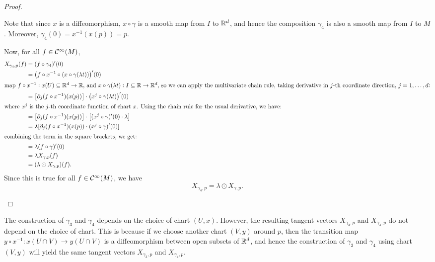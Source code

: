 \begin{proof}
\begin{enumerate}
		      Note that since \(x\) is a diffeomorphism, \(x \circ \gamma\) is a smooth map from \(I\) to \(\mathbb R^d\), and hence the composition \(\gamma_4\) is also a smooth map from \(I\) to \(M\). Moreover, \(\gamma_4(0) = x^{-1}(x(p)) = p\).

		      Now, for all \(f \in \mathcal C^\infty(M)\),
		      \begin{align*}
			      X_{\gamma_4, p}(f) & = (f \circ \gamma_4)'(0)                                                                   \\
			                         & = \qty(f \circ x^{-1} \circ (x \circ \gamma(\lambda t)))'(0)                               \\
			      \intertext{map \(f \circ x^{-1}: x(U) \subseteq \mathbb R^d \to \mathbb R\), and \(x \circ \gamma(\lambda t): I \subseteq \mathbb R\to \mathbb R^d\), so we can apply the multivariate chain rule, taking derivative in \(j\)-th coordinate direction, \(j = 1, \ldots, d\):}
			                         & = \qty[\partial_j (f \circ x^{-1})(x(p))] \cdot \qty(x^j \circ \gamma(\lambda t))'(0)      \\
			      \shortintertext{where \(x^j\) is the \(j\)-th coordinate function of chart \(x\). Using the chain rule for the usual derivative, we have:}
			                         & = \qty[\partial_j (f \circ x^{-1})(x(p))] \cdot \qty[(x^j \circ \gamma)'(0) \cdot \lambda] \\
			                         & = \lambda [\partial_j (f \circ x^{-1})(x(p)) \cdot (x^j \circ \gamma)'(0)]                 \\
			      \shortintertext{combining the term in the square brackets, we get:}
			                         & = \lambda (f \circ \gamma)'(0)                                                             \\
			                         & = \lambda X_{\gamma, p}(f)                                                                 \\
			                         & = (\lambda \odot X_{\gamma, p})(f).
		      \end{align*}
		      Since this is true for all \(f \in \mathcal C^\infty(M)\), we have
		      \begin{equation}
			      X_{\gamma_4, p} = \lambda \odot X_{\gamma, p}.
		      \end{equation}
	\end{enumerate}
\end{proof}
\begin{remark}
	The construction of \(\gamma_3\) and \(\gamma_4\) depends on the choice of chart \((U, x)\). However, the resulting tangent vectors \(X_{\gamma_3, p}\) and \(X_{\gamma_4, p}\) do not depend on the choice of chart. This is because if we choose another chart \((V, y)\) around \(p\), then the transition map \(y \circ x^{-1}: x(U \cap V) \to y(U \cap V)\) is a diffeomorphism between open subsets of \(\mathbb R^d\), and hence the construction of \(\gamma_3\) and \(\gamma_4\) using chart \((V, y)\) will yield the same tangent vectors \(X_{\gamma_3, p}\) and \(X_{\gamma_4, p}\).
\end{remark}

